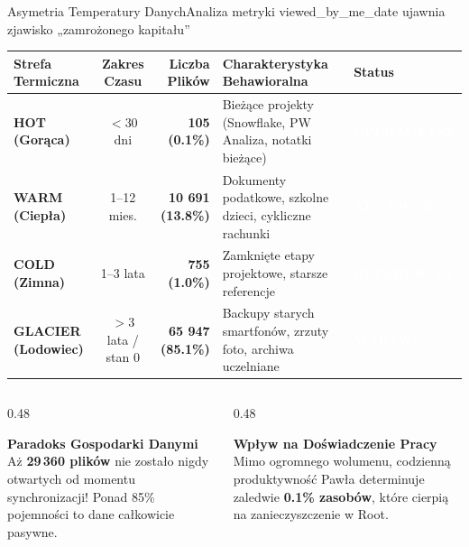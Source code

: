 \documentclass[aspectratio=169, 10pt]{beamer}
\newcommand{\badge}[2]{{\setlength{\fboxsep}{2pt}\colorbox{#1}{\textcolor{white}{\sffamily\bfseries\tiny #2}}}}
\newcommand{\alertTag}[1]{{\badge{brandRed}{#1}}}
\newcommand{\okTag}[1]{{\badge{brandGreen}{#1}}}
\newcommand{\infoTag}[1]{{\badge{brandBlue}{#1}}}
\newcommand{\warnTag}[1]{{\badge{brandOrange}{#1}}}
\begin{document}
\begin{frame}{Asymetria Temperatury Danych}{Analiza metryki viewed\_by\_me\_date ujawnia zjawisko „zamrożonego kapitału”}
  \begin{center}
    \small
    \begin{tabularx}{\textwidth}{lcrXl}
      \toprule
      \textbf{Strefa Termiczna} & \textbf{Zakres Czasu} & \textbf{Liczba Plików} & \textbf{Charakterystyka Behawioralna} & \textbf{Status} \\
      \midrule
      \textbf{HOT (Gorąca)} & $<30$ dni & \textbf{105 (0.1\%)} & Bieżące projekty (Snowflake, PW Analiza, notatki bieżące) & \okTag{OPERACYJNE} \\
      \textbf{WARM (Ciepła)} & 1--12 mies. & \textbf{10 691 (13.8\%)} & Dokumenty podatkowe, szkolne dzieci, cykliczne rachunki & \infoTag{AKTYWNE} \\
      \textbf{COLD (Zimna)} & 1--3 lata & \textbf{755 (1.0\%)} & Zamknięte etapy projektowe, starsze referencje & \warnTag{REFERENCJA} \\
      \textbf{GLACIER (Lodowiec)} & $>3$ lata / stan 0 & \textbf{65 947 (85.1\%)} & Backupy starych smartfonów, zrzuty foto, archiwa uczelniane & \alertTag{MARTWE} \\
      \bottomrule
    \end{tabularx}
  \end{center}

  \vspace{0.3cm}
  \begin{columns}[T]
    \begin{column}{0.48\textwidth}
      \begin{alertblock}{\textbf{Paradoks Gospodarki Danymi}}
        \footnotesize
        Aż \textbf{29\,360 plików} nie zostało nigdy otwartych od momentu synchronizacji! Ponad 85\% pojemności to dane całkowicie pasywne.
      \end{alertblock}
    \end{column}
    
    \begin{column}{0.48\textwidth}
      \begin{block}{\textbf{Wpływ na Doświadczenie Pracy}}
        \footnotesize
        Mimo ogromnego wolumenu, codzienną produktywność Pawła determinuje zaledwie \textbf{0.1\% zasobów}, które cierpią na zanieczyszczenie w Root.
      \end{block}
    \end{column}
  \end{columns}
\end{frame}
\end{document}
